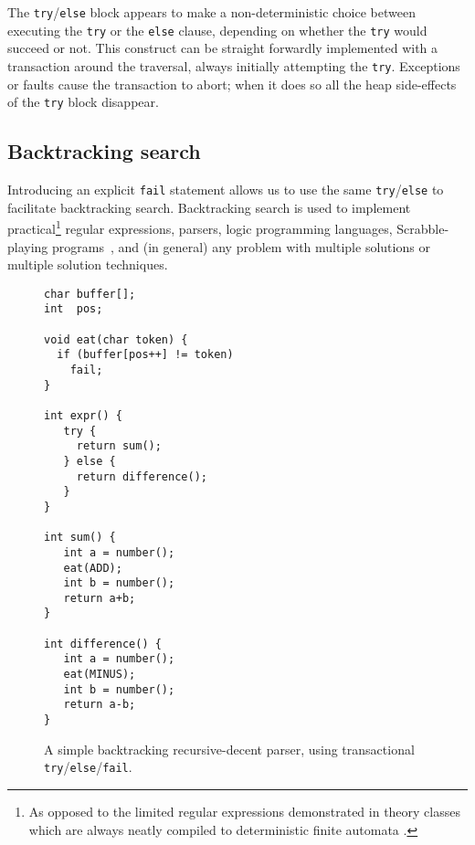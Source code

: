 The {\tt try}/{\tt else} block appears to make a non-deterministic
choice between executing the {\tt try} or the {\tt else} clause,
depending on whether the {\tt try} would succeed or not.
This construct can be straight forwardly implemented
with a transaction around the traversal,
always initially attempting
the {\tt try}.  Exceptions or faults cause the transaction to abort;
when it does so all the
heap side-effects of the {\tt try} block disappear.

\subsection{Backtracking search}\label{sec:backtrack}
Introducing an explicit {\tt fail} statement allows us to use the same
{\tt try}/{\tt else} to facilitate backtracking
search. Backtracking search is used to implement
practical\footnote{As opposed to the limited regular expressions
demonstrated in theory classes which are always neatly compiled to
deterministic finite automata \cite{Friedl02}.} regular expressions,
parsers, logic programming languages, Scrabble-playing
programs~\cite{AppelJa88}, and (in general) any problem with multiple
solutions or multiple solution techniques.

\begin{figure}\sis\fontsize{9}{10}\begin{verbatim}
char buffer[];
int  pos;

void eat(char token) {
  if (buffer[pos++] != token)
    fail;
}

int expr() {
   try {
     return sum();
   } else {
     return difference();
   }
}

int sum() {
   int a = number();
   eat(ADD);
   int b = number();
   return a+b;
}

int difference() {
   int a = number();
   eat(MINUS);
   int b = number();
   return a-b;
}
\end{verbatim}
\caption[A simple backtracking recursive-decent parser.]
{A simple backtracking recursive-decent parser, using transactional \texttt{try}/\texttt{else}/\texttt{fail}.}
\label{fig:backtrack-parser}
\end{figure}

